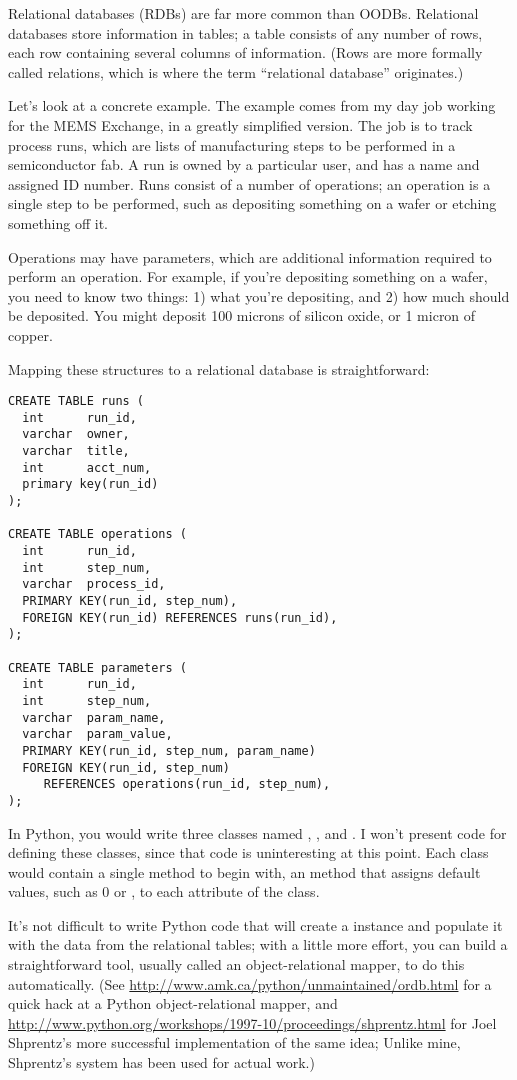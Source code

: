 Relational databases (RDBs) are far more common than OODBs.
Relational databases store information in tables; a table consists of
any number of rows, each row containing several columns of
information.  (Rows are more formally called relations, which is where
the term ``relational database'' originates.)

Let's look at a concrete example.  The example comes from my day job
working for the MEMS Exchange, in a greatly simplified version.  The
job is to track process runs, which are lists of manufacturing steps
to be performed in a semiconductor fab.  A run is owned by a
particular user, and has a name and assigned ID number.  Runs consist
of a number of operations; an operation is a single step to be
performed, such as depositing something on a wafer or etching
something off it.

Operations may have parameters, which are additional information
required to perform an operation.  For example, if you're depositing
something on a wafer, you need to know two things: 1) what you're
depositing, and 2) how much should be deposited.  You might deposit
100 microns of silicon oxide, or 1 micron of copper.

Mapping these structures to a relational database is straightforward:

\begin{verbatim}
CREATE TABLE runs (
  int      run_id,
  varchar  owner,
  varchar  title,
  int      acct_num,
  primary key(run_id)
);

CREATE TABLE operations (
  int      run_id,
  int      step_num, 
  varchar  process_id,
  PRIMARY KEY(run_id, step_num),
  FOREIGN KEY(run_id) REFERENCES runs(run_id),
);

CREATE TABLE parameters (
  int      run_id,
  int      step_num, 
  varchar  param_name, 
  varchar  param_value,
  PRIMARY KEY(run_id, step_num, param_name)
  FOREIGN KEY(run_id, step_num) 
     REFERENCES operations(run_id, step_num),
);  
\end{verbatim}

In Python, you would write three classes named ,
, and .  I won't present code for
defining these classes, since that code is uninteresting at this
point. Each class would contain a single method to begin with, an
 method that assigns default values, such as 0 or
, to each attribute of the class.

It's not difficult to write Python code that will create a 
instance and populate it with the data from the relational tables;
with a little more effort, you can build a straightforward tool,
usually called an object-relational mapper, to do this automatically.
(See
\url{http://www.amk.ca/python/unmaintained/ordb.html} for a quick hack
at a Python object-relational mapper, and
\url{http://www.python.org/workshops/1997-10/proceedings/shprentz.html}
for Joel Shprentz's more successful implementation of the same idea;
Unlike mine, Shprentz's system has been used for actual work.)

